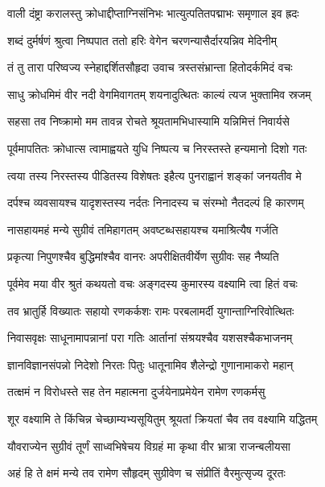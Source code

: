 \twolineshloka
{वाली दंष्ट्रा करालस्तु क्रोधाद्दीप्ताग्निसंनिभः}
{भात्युत्पतितपद्माभः समृणाल इव ह्रदः} %

\twolineshloka
{शब्दं दुर्मर्षणं श्रुत्वा निष्पपात ततो हरिः}
{वेगेन चरणन्यासैर्दारयन्निव मेदिनीम्} %

\twolineshloka
{तं तु तारा परिष्वज्य स्नेहाद्दर्शितसौहृदा}
{उवाच त्रस्तसंभ्रान्ता हितोदर्कमिदं वचः} %

\twolineshloka
{साधु क्रोधमिमं वीर नदी वेगमिवागतम्}
{शयनादुत्थितः काल्यं त्यज भुक्तामिव स्रजम्} %

\twolineshloka
{सहसा तव निष्क्रामो मम तावन्न रोचते}
{श्रूयतामभिधास्यामि यन्निमित्तं निवार्यसे} %

\twolineshloka
{पूर्वमापतितः क्रोधात्स त्वामाह्वयते युधि}
{निष्पत्य च निरस्तस्ते हन्यमानो दिशो गतः} %

\twolineshloka
{त्वया तस्य निरस्तस्य पीडितस्य विशेषतः}
{इहैत्य पुनराह्वानं शङ्कां जनयतीव मे} %

\twolineshloka
{दर्पश्च व्यवसायश्च यादृशस्तस्य नर्दतः}
{निनादस्य च संरम्भो नैतदल्पं हि कारणम्} %

\twolineshloka
{नासहायमहं मन्ये सुग्रीवं तमिहागतम्}
{अवष्टब्धसहायश्च यमाश्रित्यैष गर्जति} %

\twolineshloka
{प्रकृत्या निपुणश्चैव बुद्धिमांश्चैव वानरः}
{अपरीक्षितवीर्येण सुग्रीवः सह नैष्यति} %

\twolineshloka
{पूर्वमेव मया वीर श्रुतं कथयतो वचः}
{अङ्गदस्य कुमारस्य वक्ष्यामि त्वा हितं वचः} %

\twolineshloka
{तव भ्रातुर्हि विख्यातः सहायो रणकर्कशः}
{रामः परबलामर्दी युगान्ताग्निरिवोत्थितः} %

\twolineshloka
{निवासवृक्षः साधूनामापन्नानां परा गतिः}
{आर्तानां संश्रयश्चैव यशसश्चैकभाजनम्} %

\twolineshloka
{ज्ञानविज्ञानसंपन्नो निदेशो निरतः पितुः}
{धातूनामिव शैलेन्द्रो गुणानामाकरो महान्} %

\twolineshloka
{तत्क्षमं न विरोधस्ते सह तेन महात्मना}
{दुर्जयेनाप्रमेयेन रामेण रणकर्मसु} %

\twolineshloka
{शूर वक्ष्यामि ते किंचिन्न चेच्छाम्यभ्यसूयितुम्}
{श्रूयतां क्रियतां चैव तव वक्ष्यामि यद्धितम्} %

\twolineshloka
{यौवराज्येन सुग्रीवं तूर्णं साध्वभिषेचय}
{विग्रहं मा कृथा वीर भ्रात्रा राजन्बलीयसा} %

\twolineshloka
{अहं हि ते क्षमं मन्ये तव रामेण सौहृदम्}
{सुग्रीवेण च संप्रीतिं वैरमुत्सृज्य दूरतः} %

